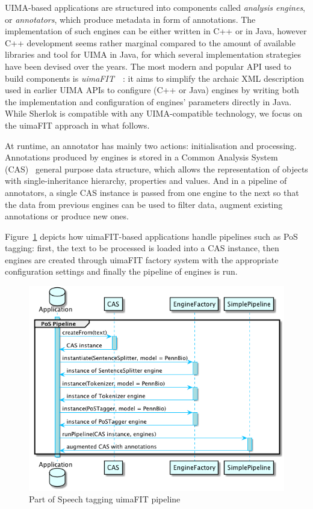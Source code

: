 \documentclass{article}
\begin{document}
UIMA-based applications are structured into components called \emph{analysis engines}, or
\emph{annotators}, which produce metadata in form of annotations. The implementation of such engines
can be either written in C++ or in Java, however C++ development seems rather marginal compared to
the amount of available libraries and tool for UIMA in Java, for which several implementation
strategies have been devised over the years. The most modern and popular API used to build
components is \emph{uimaFIT}~\cite{uimafit}~\cite{uimafit_2009}: it aims to simplify the archaic XML
description used in earlier UIMA APIs to configure (C++ or Java) engines by writing both the
implementation and configuration of engines' parameters directly in Java. While Sherlok is
compatible with any UIMA-compatible technology, we focus on the uimaFIT approach in what follows.

At runtime, an annotator has mainly two actions: initialisation and processing. Annotations produced
by engines is stored in a Common Analysis System (CAS)~\cite{cas} general purpose data structure,
which allows the representation of objects with single-inheritance hierarchy, properties and values.
And in a pipeline of annotators, a single CAS instance is passed from one engine to the next so that
the data from previous engines can be used to filter data, augment existing annotations or produce
new ones.

Figure~\ref{fig:pos_pipeline_uimafit} depicts how uimaFIT-based applications handle pipelines such
as PoS tagging: first, the text to be processed is loaded into a CAS instance, then engines are
created through uimaFIT factory system with the appropriate configuration settings and finally the
pipeline of engines is run.

\begin{figure}[h]
    \centering
    \includegraphics[width=0.9\linewidth]{res/uimafit.png}
    \caption{Part of Speech tagging uimaFIT pipeline}
    \label{fig:pos_pipeline_uimafit}
\end{figure}
\end{document}
